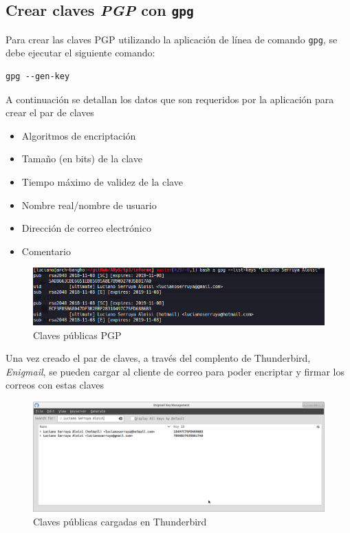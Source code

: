 \subsection{Crear claves \emph{PGP} con \texttt{gpg}}

Para crear las claves PGP utilizando la aplicación de línea de comando \texttt{gpg}, se debe ejecutar el siguiente comando:

\begin{lstlisting}
gpg --gen-key 
\end{lstlisting}

A continuación se detallan los datos que son requeridos por la aplicación para crear el par de claves

\begin{itemize}
    \item Algoritmos de encriptación
    \item Tamaño (en bits) de la clave
    \item Tiempo máximo de validez de la clave
    \item Nombre real/nombre de usuario
    \item Dirección de correo electrónico
    \item Comentario
\end{itemize}

\begin{figure}[H]
    \centering
    \includegraphics[width=\linewidth]{images/arys-tp3-gpg-claves-publicas.png}
    \caption*{Claves públicas PGP}
\end{figure}

Una vez creado el par de claves, a través del complento de Thunderbird, \emph{Enigmail}, se pueden cargar al cliente de correo para poder encriptar y firmar los correos con estas claves

\begin{figure}[H]
    \centering
    \includegraphics[width=\linewidth]{images/arys-tp3-claves-pgp-thunderbird.png}
    \caption*{Claves públicas cargadas en Thunderbird}
\end{figure}

